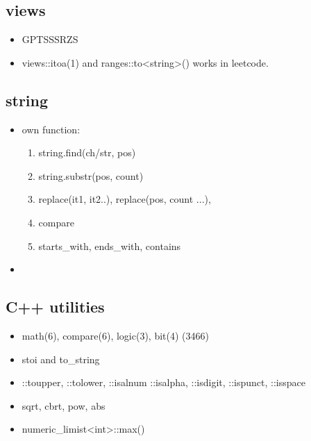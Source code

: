 \documentclass[a4paper,11pt,twoside]{book}
\begin{document}
\subsection{views}
\begin{itemize}
	\item GPTSSSRZS
	
	\item views::itoa(1) and ranges::to<string>() works in leetcode.
\end{itemize}


\subsection{string}
\begin{itemize}
	\item own function:
	\begin{enumerate}
		\item string.find(ch/str, pos)
		
		\item string.substr(pos, count)
		
		\item replace(it1, it2..), replace(pos, count ...),
		
		\item compare
		
		\item starts\_with, ends\_with, contains
		
	\end{enumerate}
	
	\item 
\end{itemize}

\subsection{C++ utilities}
\begin{itemize}
	\item math(6), compare(6), logic(3), bit(4) (3466)
	
	\item stoi and to\_string
	
	\item ::toupper, ::tolower, ::isalnum ::isalpha, ::isdigit, ::ispunct, ::isspace
	
	\item sqrt, cbrt, pow, abs
	
	\item numeric\_limist<int>::max()
\end{itemize}
\end{document}
